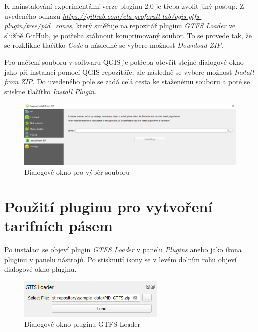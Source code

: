 K nainstalování experimentální verze pluginu 2.0 je třeba zvolit jiný postup.
Z uvedeného odkazu \href{https://github.com/ctu-geoforall-lab/qgis-gtfs-plugin/tree/pid\_zones}
{\textit{https://github.com/ctu-geoforall-lab/qgis-gtfs-plugin/tree/pid\_zo\-nes}}, který směřuje na repozitář
pluginu \textit{GTFS Loader} ve službě GitHub, je potřeba stáhnout komprimovaný  soubor. 
To se provede tak, že se rozklikne tlačítko \textit{Code} a následně se vybere možnost
\textit{Download ZIP}.  

Pro načtení  souboru v softwaru QGIS je potřeba otevřít stejné dialogové okno
jako při instalaci pomocí QGIS repozitáře, ale následně se vybere možnost \textit{Install from ZIP}. 
Do uvedeného pole se zadá celá cesta ke staženému  souboru a poté se stiskne tlačítko
\textit{Install Plugin}.

\begin{figure}[H] \centering
    \includegraphics[width=400pt]{./pictures-dodatek/zip.png}
    \caption[Dialogové okno pro výběr  souboru]{Dialogové okno pro výběr  souboru}
	\label{fig:zip}              
\end{figure} 

\section{Použití pluginu pro vytvoření tarifních pásem}

Po instalaci se objeví plugin \textit{GTFS Loader} v panelu \textit{Plugins} anebo jako ikona pluginu
v panelu nástrojů. Po stisknutí ikony se v levém dolním rohu objeví dialogové okno pluginu.

\begin{figure}[H] \centering
    \includegraphics[width=200pt]{./pictures-dodatek/plugin.png}
    \caption[Dialogové okno pluginu GTFS Loader]{Dialogové okno pluginu GTFS Loader}
	\label{fig:gtfs_loader}              
\end{figure} 

